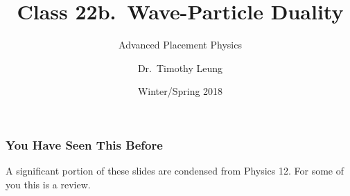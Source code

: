 \documentclass[12pt,compress,aspectratio=169]{beamer}
\title[Quantum]{Class 22b.\ Wave-Particle Duality}
\subtitle{Advanced Placement Physics}
\author[TML]{Dr.\ Timothy Leung}
\institute{Olympiads School}
\date{Winter/Spring 2018}
\newcommand{\pic}[2]{\texttt{[image: \#2]}}
\begin{document}
\begin{frame}
  \maketitle
\end{frame}


\begin{frame}
  \frametitle{You Have Seen This Before}
  A significant portion of these slides are condensed from Physics 12. For
  some of you this is a review.
\end{frame}



%
%      
\end{document}
